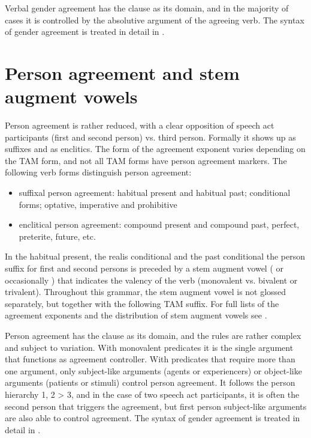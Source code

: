 Verbal gender agreement has the clause as its domain, and in the majority of cases it is controlled by the absolutive argument of the agreeing verb. The syntax of gender agreement is treated in detail in .



\section{Person agreement and stem augment vowels}
\label{sec:Stem augment vowels and person agreement}

Person agreement is rather reduced, with a clear opposition of speech act participants (first and second person) vs. third person. Formally it shows up as suffixes and as enclitics. The form of the agreement exponent varies depending on the TAM form, and not all TAM forms have person agreement markers. The following verb forms distinguish person agreement:
%
\begin{itemize}
	\item	suffixal person agreement: habitual present and habitual past; conditional forms; optative, imperative and prohibitive
	\item	enclitical person agreement: compound present and compound past, perfect, preterite, future, etc.
\end{itemize}
%
In the habitual present, the realis conditional and the past conditional the person suffix for first and second persons is preceded by a stem augment vowel ( or occasionally ) that indicates the valency of the verb (monovalent vs. bivalent or trivalent). Throughout this grammar, the stem augment vowel is not glossed separately, but together with the following TAM suffix. For full lists of the agreement exponents and the distribution of stem augment vowels see .

Person agreement has the clause as its domain, and the rules are rather complex and subject to variation. With monovalent predicates it is the single argument that functions as agreement controller. With predicates that require more than one argument, only subject-like arguments (agents or experiencers) or object-like arguments (patients or stimuli) control person agreement. It follows the person hierarchy 1, 2 > 3, and in the case of two speech act participants, it is often the second person that triggers the agreement, but first person subject-like arguments are also able to control agreement. The syntax of gender agreement is treated in detail in .


